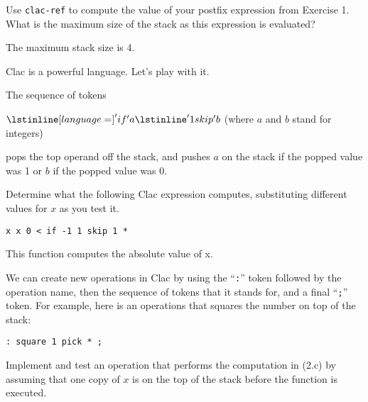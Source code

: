 \begin{part}
  Use \lstinline'clac-ref' to compute the value of your postfix
  expression from Exercise 1. What is the maximum size of the stack as
  this expression is evaluated?

\twoPT
\end{part}
\begin{solution}
The maximum stack size is 4.
\end{solution}

Clac is a powerful language.  Let's play with it.


The sequence of tokens

$\lstinline[language=]'if ' a \lstinline' 1 skip ' b$ \qquad (where
$a$ and $b$ stand for integers)

pops the top operand off the stack, and pushes $a$ on the stack if the
popped value was 1 or $b$ if the popped value was 0.

\begin{part}
  Determine what the following Clac expression computes, substituting
  different values for $x$ as you test it.

  \lstinline'x x 0 < if -1 1 skip 1 *'
\end{part}

\begin{solution}
This function computes the absolute value of x.
\end{solution}



We can create new operations in Clac by using the ``\lstinline':'''
token followed by the operation name, then the sequence of tokens that
it stands for, and a final ``\lstinline';''' token.  For example, here
is an operations that squares the number on top of the stack:

\lstinline': square 1 pick * ;'


\begin{part}
  Implement and test an operation that performs the computation in
  (2.c) by assuming that one copy of $x$ is on the top of the stack
  before the function is executed.

\threePT
\end{part}

